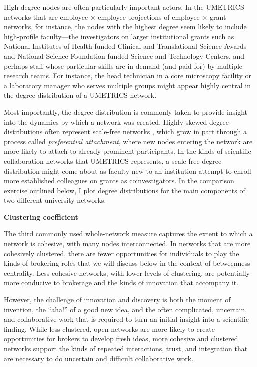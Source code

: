 \documentclass[]{krantz}
\begin{document}
High-degree nodes are often particularly important actors. In the
UMETRICS networks that are employee \(\times\) employee projections of
employee \(\times\) grant networks, for instance, the nodes with the
highest degree seem likely to include high-profile faculty---the
investigators on larger institutional grants such as National Institutes
of Health-funded Clinical and Translational Science Awards and National
Science Foundation-funded Science and Technology Centers, and perhaps
staff whose particular skills are in demand (and paid for) by multiple
research teams. For instance, the head technician in a core microscopy
facility or a laboratory manager who serves multiple groups might appear
highly central in the degree distribution of a UMETRICS network.

Most importantly, the degree distribution is commonly taken to provide
insight into the dynamics by which a network was created. Highly skewed
degree distributions often represent scale-free networks
\citep{powell2005network, barabasi1999emergence, newman2005measure},
which grow in part through a process called \emph{preferential
attachment}, where new nodes entering the network are more likely to
attach to already prominent participants. In the kinds of scientific
collaboration networks that UMETRICS represents, a scale-free degree
distribution might come about as faculty new to an institution attempt
to enroll more established colleagues on grants as coinvestigators. In
the comparison exercise outlined below, I plot degree distributions for
the main components of two different university networks.

\textbf{Clustering coefficient}

The third commonly used whole-network measure captures the extent to
which a network is cohesive, with many nodes interconnected. In networks
that are more cohesively clustered, there are fewer opportunities for
individuals to play the kinds of brokering roles that we will discuss
below in the context of betweenness centrality. Less cohesive networks,
with lower levels of clustering, are potentially more conducive to
brokerage and the kinds of innovation that accompany it.

However, the challenge of innovation and discovery is both the moment of
invention, the ``aha!'' of a good new idea, and the often complicated,
uncertain, and collaborative work that is required to turn an initial
insight into a scientific finding. While less clustered, open networks
are more likely to create opportunities for brokers to develop fresh
ideas, more cohesive and clustered networks support the kinds of
repeated interactions, trust, and integration that are necessary to do
uncertain and difficult collaborative work.
\end{document}
